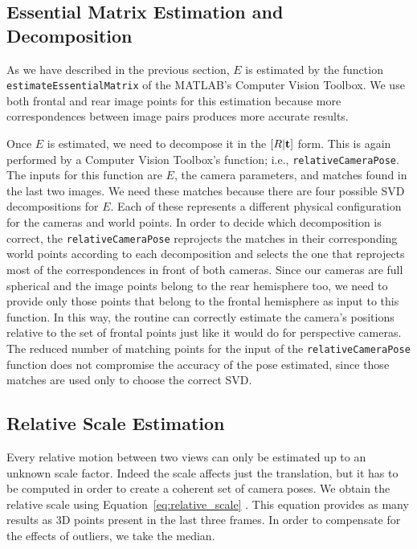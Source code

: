 \subsection{Essential Matrix Estimation and Decomposition}
As we have described in the previous section, $E$ is estimated 
by the function {\tt estimateEssentialMatrix} of the MATLAB's 
Computer Vision Toolbox.
We use both frontal and rear image points for this estimation because
more correspondences between image pairs produces more accurate results.

Once $E$ is estimated, we need to decompose it in the 
\( [R|\mathbf{t} ] \) form. This is again performed by a Computer Vision 
Toolbox's function; i.e., {\tt relativeCameraPose}.
The inputs for this function are $E$, the camera parameters, and matches found in the last two images.
We need these matches because there are four possible SVD decompositions for $E$. Each of these represents a different physical configuration for the cameras and world points.
In order to decide which decomposition is correct, the {\tt relativeCameraPose}
reprojects the matches in their corresponding world points according to each 
decomposition and selects the one that reprojects most of the correspondences in 
front of both cameras.
Since our cameras are full spherical and the image points belong to the 
rear hemisphere too, we need to provide only those points that belong to the 
frontal hemisphere as input to this function. In this way, the routine 
can correctly estimate the camera's positions relative to the set of frontal
points just like it would do for perspective cameras.
The reduced number of matching points for the input of the 
{\tt relativeCameraPose} function does not compromise the accuracy of the pose 
estimated, since those matches are used only to choose the 
correct SVD.

\subsection{Relative Scale Estimation}
Every relative motion between two views can only be estimated up to an unknown 
scale factor. Indeed the scale affects just the translation, but it has to 
be computed in order to create a coherent set of camera poses.
We obtain the relative scale using 
Equation~\ref{eq:relative_scale} \cite{scaramuzzaVisualOdometryI}.
This equation provides as many results as 3D points present in the last three
frames. In order to compensate for the effects of outliers, we take the 
median.

